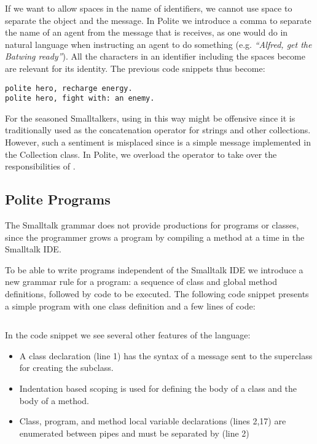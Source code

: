 If we want to allow spaces in the name of identifiers, we cannot use space to separate the object and the message. In Polite we introduce a comma to separate the name of an agent from the message that is receives, as one would do in natural language when instructing an agent to do something (e.g. {\em ``Alfred, get the Batwing ready''}). All the characters in an identifier including the spaces become are relevant for its identity. The previous code snippets thus become: 

\begin{verbatim} 
polite hero, recharge energy. 
polite hero, fight with: an enemy.
\end{verbatim}

For the seasoned Smalltalkers, using \comma in this way might be offensive since it is traditionally used as the concatenation operator for strings and other collections. However, such a sentiment is misplaced since \comma is a simple message implemented in the Collection class. In Polite, we overload the \plus operator to take over the responsibilities of \comma.


\subsection{Polite Programs}
The Smalltalk grammar does not provide productions for programs or classes, since the programmer grows a program by compiling a method at a time in the Smalltalk IDE. 

To be able to write programs independent of the Smalltalk IDE we introduce a new grammar rule for a program: a sequence of class and global method definitions, followed by code to be executed. The following code snippet presents a simple program with one class definition and a few lines of code: 

\inputminted[bgcolor=lbcolor,linenos]{text}{polite-hero.polite}

In the code snippet we see several other features of the language: 

\begin{itemize}

	\item A class declaration (line 1) has the syntax of a message sent to the superclass for creating the subclass. 

	\item Indentation based scoping is used for defining the body of a class and the body of a method. 

	\item Class, program, and method local variable declarations (lines 2,17) are enumerated between pipes and must be separated by \comma (line 2)

\end{itemize}


